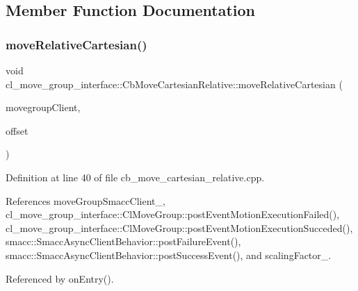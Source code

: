 \subsection{Member Function Documentation}
\mbox{\label{classcl__move__group__interface_1_1CbMoveCartesianRelative_ae8443c7f81affe5c4450e83fc665487f}} 
\subsubsection{\texorpdfstring{move\+Relative\+Cartesian()}{moveRelativeCartesian()}}
{\footnotesize\ttfamily void cl\+\_\+move\+\_\+group\+\_\+interface\+::\+Cb\+Move\+Cartesian\+Relative\+::move\+Relative\+Cartesian (\begin{DoxyParamCaption}\item[{moveit\+::planning\+\_\+interface\+::\+Move\+Group\+Interface $\ast$}]{movegroup\+Client,  }\item[{geometry\+\_\+msgs\+::\+Vector3 \&}]{offset }\end{DoxyParamCaption})}



Definition at line 40 of file cb\+\_\+move\+\_\+cartesian\+\_\+relative.\+cpp.



References move\+Group\+Smacc\+Client\+\_\+, cl\+\_\+move\+\_\+group\+\_\+interface\+::\+Cl\+Move\+Group\+::post\+Event\+Motion\+Execution\+Failed(), cl\+\_\+move\+\_\+group\+\_\+interface\+::\+Cl\+Move\+Group\+::post\+Event\+Motion\+Execution\+Succeded(), smacc\+::\+Smacc\+Async\+Client\+Behavior\+::post\+Failure\+Event(), smacc\+::\+Smacc\+Async\+Client\+Behavior\+::post\+Success\+Event(), and scaling\+Factor\+\_\+.



Referenced by on\+Entry().


